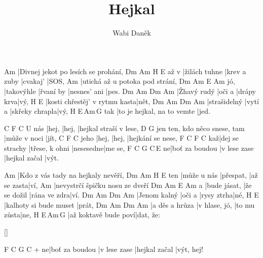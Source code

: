 \documentclass{song}
\title{Hejkal}
\author{Wabi Daněk}
\begin{document}
\strophe
Am
|Divnej jekot po lesích se prohání,
     Dm            Am           H\7      E
až v |žilách tuhne |krev a zuby |cvakaj' |SOS,
Am
|utichá až u potoka pod strání,
    Dm         Am        E            Am
jó, |takovýhle |řvaní by |nesnes' ani |pes.
Dm          Am     Dm         Am
|Žhavý rudý |oči a |drápy krva|vý,
H\7                           E
|kosti chřestěj' v rytmu kasta|nět,
Dm           Am      Dm             Am
|strašidelný |vytí a |skřeky chrapla|vý,
    H\7                        E\,Am\,G
tak |to je hejkal, na to vemte |jed.
\endstrophe

      C     F     C
U nás |hej, |hej, |hejkal straší v lese,
                             D\7          G
jen ten, kdo něco snese, tam |může v noci |jít,
     C     F     C
jeho |hej, |hej, |hejkání se nese,
   F               C              F         C
kaž|dej se strachy |třese, k ohni |nesesedne|me se,
  F              C            G             C\,E
ne|boť za boudou |v lese zase |hejkal začal |výt.
\endstrophe

\strophe
Am
|Kdo z vás tady na hejkaly nevěří,
    Dm          Am        H\7         E
ten |může u nás |přespat, |až se zasta|ví,
Am
|nevystrčí špičku nosu ze dveří
  Dm           Am           E            Am
a |bude jásat, |že se dožil |rána ve zdra|ví.
Dm           Am     Dm         Am
|Jenom kalný |oči a |rysy ztrha|né,
H\7                    E
|kalhoty si bude muset |prát,
Dm             Am            Dm          Am
|a děs a hrůza |v hlase, jó, |to mu zůsta|ne,
H\7                  E\,Am\,G
|až koktavě bude poví|dat, že:
\endstrophe

\ref{}

\strophe
    F              C            G             C
+ ne|boť za boudou |v lese zase |hejkal začal |výt, hej!
\endstrophe
\end{document}
